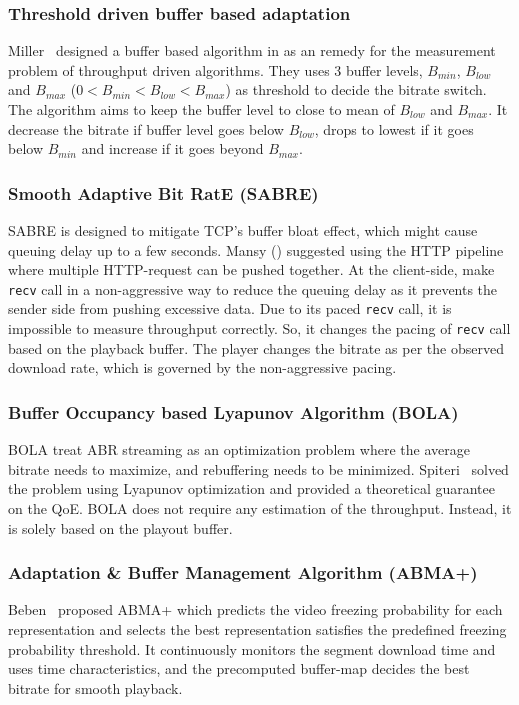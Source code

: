 \subsubsection{Threshold driven buffer based adaptation}
Miller \etal\ designed a buffer based algorithm in \cite{6229732} as an remedy for the measurement problem of throughput driven algorithms. They uses 3 buffer levels, $B_{min}$, $B_{low}$ and $B_{max}$ ($0 < B_{min} < B_{low} < B_{max}$) as threshold to decide the bitrate switch. The algorithm aims to keep the buffer level to close to mean of $B_{low}$ and $B_{max}$. It decrease the bitrate if buffer level goes below $B_{low}$, drops to lowest if it goes below $B_{min}$ and increase if it goes beyond $B_{max}$.

\subsubsection{Smooth Adaptive Bit RatE (SABRE)}
SABRE is designed to mitigate TCP's buffer bloat effect, which might cause queuing delay up to a few seconds. Mansy \etal(\cite{10.1145/2483977.2484004}) suggested using the HTTP pipeline where multiple HTTP-request can be pushed together. At the client-side, make {\tt recv} call in a non-aggressive way to reduce the queuing delay as it prevents the sender side from pushing excessive data. Due to its paced {\tt recv} call, it is impossible to measure throughput correctly. So, it changes the pacing of {\tt recv} call based on the playback buffer. The player changes the bitrate as per the observed download rate, which is governed by the non-aggressive pacing.

\subsubsection{Buffer Occupancy based Lyapunov Algorithm (BOLA)}
BOLA\cite{Spiteri2016} treat ABR streaming as an optimization problem where the average bitrate needs to maximize, and rebuffering needs to be minimized. Spiteri \etal\ solved the problem using Lyapunov optimization and provided a theoretical guarantee on the QoE. BOLA does not require any estimation of the throughput. Instead, it is solely based on the playout buffer.

\subsubsection{Adaptation \& Buffer Management Algorithm (ABMA+)}
Beben \etal\ proposed ABMA+\cite{10.1145/2910017.2910596} which predicts the video freezing probability for each representation and selects the best representation satisfies the predefined freezing probability threshold. It continuously monitors the segment download time and uses time characteristics, and the precomputed buffer-map decides the best bitrate for smooth playback.

